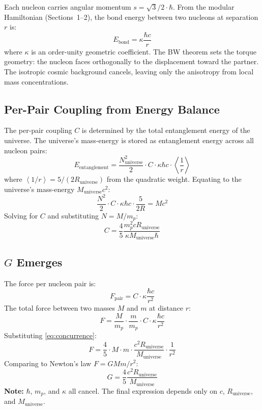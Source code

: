 \documentclass[11pt,letterpaper]{article}
\newcommand{\Runiv}{R_{\mathrm{universe}}}
\newcommand{\Muniv}{M_{\mathrm{universe}}}
\newcommand{\Nuniv}{N_{\mathrm{universe}}}
\newcommand{\av}[1]{\left\langle #1 \right\rangle}
\begin{document}
Each nucleon carries angular momentum $s = \sqrt{3}/2 \cdot \hbar$. From
the modular Hamiltonian (Sections~1--2), the bond energy between two
nucleons at separation $r$ is:
\begin{equation}
  E_{\mathrm{bond}} = \kappa \frac{\hbar c}{r}
  \label{eq:bond_energy}
\end{equation}
where $\kappa$ is an order-unity geometric coefficient. The BW theorem
sets the torque geometry: the nucleon faces orthogonally to the
displacement toward the partner. The isotropic cosmic background
cancels, leaving only the anisotropy from local mass concentrations.

\subsection{Per-Pair Coupling from Energy Balance}

The per-pair coupling $C$ is determined by the total entanglement
energy of the universe. The universe's mass-energy is stored as
entanglement energy across all nucleon pairs:
\begin{equation}
  E_{\mathrm{entanglement}}
  = \frac{\Nuniv^2}{2} \cdot C \cdot \kappa \hbar c \cdot \av{\frac{1}{r}}
  \label{eq:total_entangle}
\end{equation}
where $\av{1/r} = 5/(2\Runiv)$ from the quadratic weight.
Equating to the universe's mass-energy $\Muniv c^2$:
\begin{equation}
  \frac{N^2}{2} \cdot C \cdot \kappa \hbar c \cdot \frac{5}{2R} = M c^2
  \label{eq:energy_balance}
\end{equation}
Solving for $C$ and substituting $N = M/m_p$:
\begin{equation}
  C = \frac{4}{5} \frac{m_p^2 c \Runiv}{\kappa \Muniv \hbar}
  \label{eq:concurrence}
\end{equation}

\subsection{$G$ Emerges}

The force per nucleon pair is:
\begin{equation}
  F_{\mathrm{pair}} = C \cdot \kappa \frac{\hbar c}{r^2}
  \label{eq:pair_force}
\end{equation}
The total force between two masses $M$ and $m$ at distance $r$:
\begin{equation}
  F = \frac{M}{m_p} \cdot \frac{m}{m_p} \cdot C \cdot \kappa \frac{\hbar c}{r^2}
  \label{eq:total_force}
\end{equation}
Substituting \cref{eq:concurrence}:
\begin{equation}
  F = \frac{4}{5} \cdot M \cdot m \cdot \frac{c^2 \Runiv}{\Muniv} \cdot \frac{1}{r^2}
  \label{eq:newton_form}
\end{equation}
Comparing to Newton's law $F = G M m / r^2$:
\begin{equation}
  G = \frac{4}{5} \frac{c^2 \Runiv}{\Muniv}
  \label{eq:final_g}
\end{equation}
\textbf{Note:} $\hbar$, $m_p$, and $\kappa$ all cancel. The final expression depends
only on $c$, $\Runiv$, and $\Muniv$.
\end{document}
